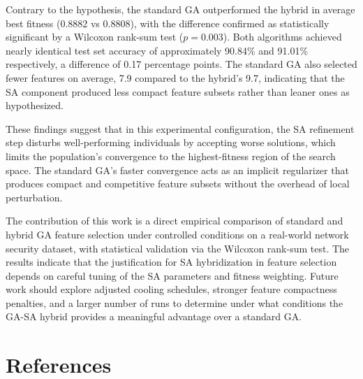 \documentclass[letterpaper]{article} %
\begin{document}
Contrary to the hypothesis, the standard GA outperformed the hybrid in average best fitness (0.8882 vs 0.8808), with the difference confirmed as statistically significant by a Wilcoxon rank-sum test ($p = 0.003$). Both algorithms achieved nearly identical test set accuracy of approximately 90.84\% and 91.01\% respectively, a difference of 0.17 percentage points. The standard GA also selected fewer features on average, 7.9 compared to the hybrid's 9.7, indicating that the SA component produced less compact feature subsets rather than leaner ones as hypothesized.

These findings suggest that in this experimental configuration, the SA refinement step disturbs well-performing individuals by accepting worse solutions, which limits the population's convergence to the highest-fitness region of the search space. The standard GA's faster convergence acts as an implicit regularizer that produces compact and competitive feature subsets without the overhead of local perturbation.

The contribution of this work is a direct empirical comparison of standard and hybrid GA feature selection under controlled conditions on a real-world network security dataset, with statistical validation via the Wilcoxon rank-sum test. The results indicate that the justification for SA hybridization in feature selection depends on careful tuning of the SA parameters and fitness weighting. Future work should explore adjusted cooling schedules, stronger feature compactness penalties, and a larger number of runs to determine under what conditions the GA-SA hybrid provides a meaningful advantage over a standard GA.

\newpage

\section{References}
\end{document}
